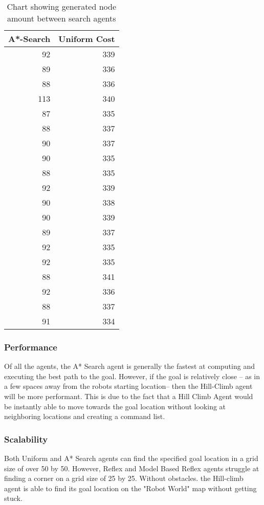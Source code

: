 \documentclass[11pt]{article}
\begin{document}
\begin{table}[htbp]
\caption{\label{tab:org744414d}Chart showing generated node amount between search agents}
\centering
\begin{tabular}{rr}
A*-Search & Uniform Cost\\
\hline
92 & 339\\
89 & 336\\
88 & 336\\
113 & 340\\
87 & 335\\
88 & 337\\
90 & 337\\
90 & 335\\
88 & 335\\
92 & 339\\
90 & 338\\
90 & 339\\
89 & 337\\
92 & 335\\
92 & 335\\
88 & 341\\
92 & 336\\
88 & 337\\
91 & 334\\
\end{tabular}
\end{table}

\subsubsection{Performance}
\label{sec:org3367bb8}
Of all the agents, the A* Search agent is generally the fastest at computing and executing
the best path to the goal. However, if the goal is relatively close -- as in a few spaces
away from the robots starting location-- then the Hill-Climb agent will be more performant.
This is due to the fact that a Hill Climb Agent would be instantly able to move towards the
goal location without looking at neighboring locations and creating a command list. 
\subsubsection{Scalability}
\label{sec:org9dcfce5}
Both Uniform and A* Search agents can find the specified goal location in a grid
size of over 50 by 50. However, Reflex and Model Based Reflex agents struggle at finding a corner
on a grid size of 25 by 25. Without obstacles. the Hill-climb agent is able to find its goal location
on the "Robot World" map without getting stuck. 
\end{document}
